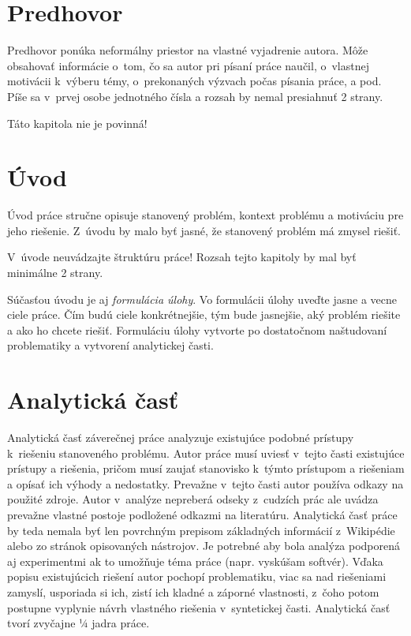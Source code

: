 \section*{Predhovor}

Predhovor ponúka neformálny priestor na vlastné vyjadrenie autora. Môže obsahovať informácie o~tom, čo sa autor pri písaní práce naučil, o~vlastnej motivácii k~výberu témy, o~prekonaných výzvach počas písania práce, a pod. Píše sa v~prvej osobe jednotného čísla a rozsah by nemal presiahnuť 2 strany.

Táto kapitola nie je povinná!


\section*{Úvod}

Úvod práce stručne opisuje stanovený problém, kontext problému a motiváciu pre jeho riešenie. Z~úvodu by malo byť jasné, že stanovený problém má zmysel riešiť.

V~úvode neuvádzajte štruktúru práce! Rozsah tejto kapitoly by mal byť minimálne 2 strany.

Súčasťou úvodu je aj \emph{formulácia úlohy}.
Vo formulácii úlohy uveďte jasne a vecne ciele práce. Čím budú ciele konkrétnejšie, tým bude jasnejšie, aký problém riešite a ako ho chcete riešiť.
Formuláciu úlohy vytvorte po dostatočnom naštudovaní problematiky a vytvorení analytickej časti.


\section*{Analytická časť}

Analytická časť záverečnej práce analyzuje existujúce podobné prístupy k~riešeniu stanoveného problému. Autor práce musí uviesť v~tejto časti existujúce prístupy a riešenia, pričom musí zaujať stanovisko k~týmto prístupom a riešeniam a opísať ich výhody a nedostatky. Prevažne v~tejto časti autor používa odkazy na použité zdroje. Autor v~analýze nepreberá odseky z~cudzích prác ale uvádza prevažne vlastné postoje podložené odkazmi na literatúru. Analytická časť práce by teda nemala byť len povrchným prepisom základných informácií z~Wikipédie alebo zo stránok opisovaných nástrojov. Je potrebné aby bola analýza podporená aj experimentmi ak to umožňuje téma práce (napr. vyskúšam softvér). Vďaka popisu existujúcich riešení autor pochopí problematiku, viac sa nad riešeniami zamyslí, usporiada si ich, zistí ich kladné a záporné vlastnosti, z~čoho potom postupne vyplynie návrh vlastného riešenia v~syntetickej časti. Analytická časť tvorí zvyčajne ¼ jadra práce.

